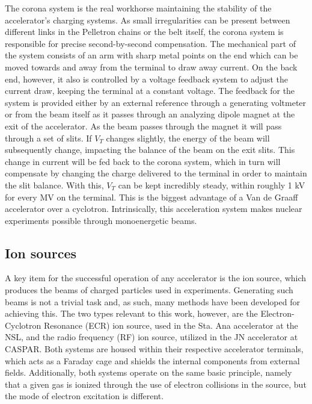 The corona system is the real workhorse maintaining the stability of the accelerator's charging systems. As small irregularities can be present between different links in the Pelletron chains or the belt itself, the corona system is responsible for precise second-by-second compensation. The mechanical part of the system consists of an arm with sharp metal points on the end which can be moved towards and away from the terminal to draw away current. On the back end, however, it also is controlled by a voltage feedback system to adjust the current draw, keeping the terminal at a constant voltage. The feedback for the system is provided either by an external reference through a generating voltmeter or from the beam itself as it passes through an analyzing dipole magnet at the exit of the accelerator. As the beam passes through the magnet it will pass through a set of slits. If $V_{T}$ changes slightly, the energy of the beam will subsequently change, impacting the balance of the beam on the exit slits. This change in current will be fed back to the corona system, which in turn will compensate by changing the charge delivered to the terminal in order to maintain the slit balance. With this, $V_{T}$ can be kept incredibly steady, within roughly 1 kV for every MV on the terminal. This is the biggest advantage of a Van de Graaff accelerator over a cyclotron. Intrinsically, this acceleration system makes nuclear experiments possible through monoenergetic beams. 


\subsection{Ion sources}
\label{sec: ion sources}

A key item for the successful operation of any accelerator is the ion source, which produces the beams of charged particles used in experiments. Generating such beams is not a trivial task and, as such, many methods have been developed for achieving this. The two types relevant to this work, however, are the Electron-Cyclotron Resonance (ECR) ion source, used in the Sta. Ana accelerator at the NSL, and the radio frequency (RF) ion source, utilized in the JN accelerator at CASPAR.  Both systems are housed within their respective accelerator terminals, which acts as a Faraday cage and shields the internal components from external fields. Additionally, both systems operate on the same basic principle, namely that a given gas is ionized through the use of electron collisions in the source, but the mode of electron excitation is different. 

